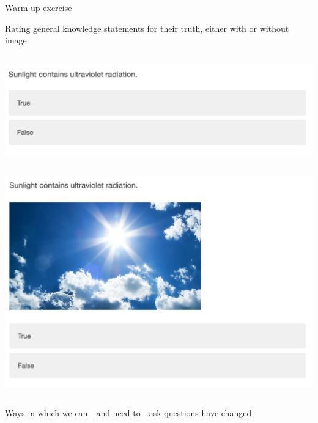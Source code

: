 \documentclass[aspectratio=169]{beamer}
\begin{document}
\begin{frame}{Warm-up exercise}

Rating general knowledge statements for their truth, either with or without image:

\vfill

\begin{column}{0.45\textwidth}
\begin{center}
\includegraphics[width=\textwidth]{figures/warmup2-control.png}
\end{center}
\end{column}
\pause
\begin{column}{0.45\textwidth}
\begin{center}
\includegraphics[width=\textwidth]{figures/warmup2-treatment.png}
\end{center}
\end{column}

\end{frame}
\begin{frame}

\begin{center}
\LARGE Ways in which we can---and need to---ask questions have changed
\end{center}

\end{frame}
\end{document}
